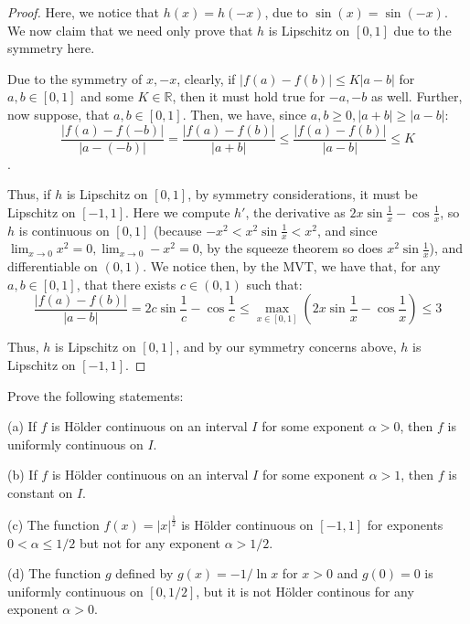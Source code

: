 \documentclass[10pt]{article}
\newenvironment{problem}[2][Problem]{\begin{trivlist}
\item[\hskip \labelsep {\bfseries #1}\hskip \labelsep {\bfseries #2.}]}{\end{trivlist}}
\begin{document}
\begin{proof}[Proof]
Here, we notice that $h(x) = h(-x)$, due to $\sin(x) = \sin(-x)$. We now claim that we need only prove that $h$ is Lipschitz on $[0,1]$ due to the symmetry here.

Due to the symmetry of $x, -x$, clearly, if $|f(a) - f(b)| \leq K|a-b|$ for  $a, b \in [0,1]$ and some $K \in \mathbb{R}$, then it must hold true for $-a, -b$ as well. Further, now suppose, that $a, b \in [0,1]$. Then, we have, since $a,b \geq 0, |a+b| \geq |a-b|$:
$$ \frac{|f(a) - f(-b)|}{|a-(-b)|} =   \frac{|f(a) - f(b)|}{|a + b|} \leq \frac{|f(a) - f(b)|}{|a - b|} \leq K$$.

Thus, if $h$ is Lipschitz on $[0,1]$, by symmetry considerations, it must be Lipschitz on $[-1,1]$. Here we compute $h'$, the derivative as $2x\sin\frac{1}{x} - \cos\frac{1}{x}$, so $h$ is continuous on $[0,1]$ (because $-x^2 < x^2\sin\frac{1}{x} < x^2$, and since $\lim_{x\to 0} x^2=0 , \lim_{x\to 0}-x^2 = 0$, by the squeeze theorem so does $x^2\sin\frac{1}{x}$), and differentiable on $(0,1)$. We notice then, by the MVT, we have that, for any $a,b \in [0,1]$, that there exists $c \in (0,1)$ such that:
$$\frac{|f(a) - f(b)|}{|a - b|} =  2c\sin\frac{1}{c} - \cos\frac{1}{c}  \leq \max_{x \in [0,1]}(2x\sin\frac{1}{x} - \cos\frac{1}{x}) \leq 3$$

Thus, $h$ is Lipschitz on $[0,1]$, and by our symmetry concerns above, $h$ is Lipschitz on $[-1,1]$.


\end{proof}

\begin{problem}{1.4.4}
Prove the following statements:

(a) If $f$ is H\"{o}lder continuous on an interval $I$ for some exponent $\alpha > 0$, then $f$ is uniformly continuous on $I$.

(b) If $f$ is H\"{o}lder continuous on an interval $I$ for some exponent $\alpha > 1$, then $f$ is constant on $I$.

(c) The function $f(x) = |x|^{\frac{1}{2}}$ is  H\"{o}lder continuous on $[-1,1]$ for exponents $0<\alpha\leq1/2$ but not for any exponent $\alpha >  1/2$.

(d) The function $g$ defined by $g(x) = -1/\ln x$ for $x > 0$ and $g(0) = 0$ is uniformly continuous on $[0,1/2]$, but it is not H\"{o}lder continous for any exponent $\alpha > 0$.
\end{problem}
\end{document}

